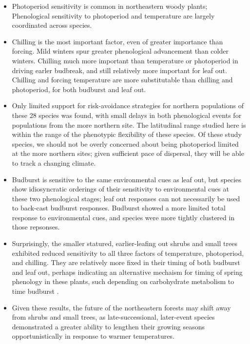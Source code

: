 \documentclass[12pt]{article}
\begin{document}
\begin{itemize}
\item{Photoperiod sensitivity is common in northeastern woody plants; Phenological sensitivity to photoperiod and temperature are largely coordinated across species.}
\item{Chilling is the most important factor, even of greater importance than forcing. Mild winters spur greater phenological advancement than colder winters. Chilling much more important than temperature or photoperiod in driving earler budbreak, and still relatively more important for leaf out. Chilling and forcing temperature are more substitutable than chilling and photoperiod, for both budburst and leaf out.}
\item{Only limited support for risk-avoidance strategies for northern populations of these 28 species was found, with small delays in both phenological events for populations from the more northern site. The latitudinal range studied here is within the range of the phenotypic flexibility of these species. Of these study species, we should not be overly concerned about being photoperiod limited at the more northern sites; given sufficient pace of dispersal, they will be able to track a changing climate.}
\item{Budburst is sensitive to the same environmental cues as leaf out, but species show idiosyncratic orderings of their sensitivity to environmental cues at these two phenological stages; leaf out responses can not necessarily be used to back-cast budburst responses. Budburst showed a more limited total response to environmental cues, and species were more tightly clustered in those repsonses.}
\item{Surprisingly, the smaller statured, earlier-leafing out shrubs and small trees exhibited reduced sensitivity to all three factors of temperature, photoperiod, and chilling. They are relatively more fixed in their timing of both budburst and leaf out, perhaps indicating an alternative mechaism for timing of spring phenology in these plants, such depending on carbohydrate metabolism to time budburst \cite{Pagter:2015}.}
\item{Given these results, the future of the northeastern forests may shift away from shrubs and small trees, as late-successional, later-event species demonstrated a greater ability to lengthen their growing seasons opportunistically in response to warmer temperatures.} %
\end{itemize}
\end{document}
